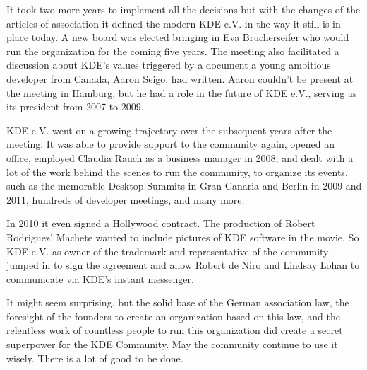It took two more years to implement all the decisions but with the changes of the articles of association it defined the modern KDE e.V. in the way it still is in place today. A new board was elected bringing in Eva Brucherseifer who would run the organization for the coming five years. The meeting also facilitated a discussion about KDE's values triggered by a document a young ambitious developer from Canada, Aaron Seigo, had written. Aaron couldn't be present at the meeting in Hamburg, but he had a role in the future of KDE e.V., serving as its president from 2007 to 2009.

KDE e.V. went on a growing trajectory over the subsequent years after the meeting. It was able to provide support to the community again, opened an office, employed Claudia Rauch as a business manager in 2008, and dealt with a lot of the work behind the scenes to run the community, to organize its events, such as the memorable Desktop Summits in Gran Canaria and Berlin in 2009 and 2011, hundreds of developer meetings, and many more.

In 2010 it even signed a Hollywood contract. The production of Robert Rodriguez' Machete wanted to include pictures of KDE software in the movie. So KDE e.V. as owner of the trademark and representative of the community jumped in to sign the agreement and allow Robert de Niro and Lindsay Lohan to communicate via KDE's instant messenger.

It might seem surprising, but the solid base of the German association law, the foresight of the founders to create an organization based on this law, and the relentless work of countless people to run this organization did create a secret superpower for the KDE Community. May the community continue to use it wisely. There is a lot of good to be done.
